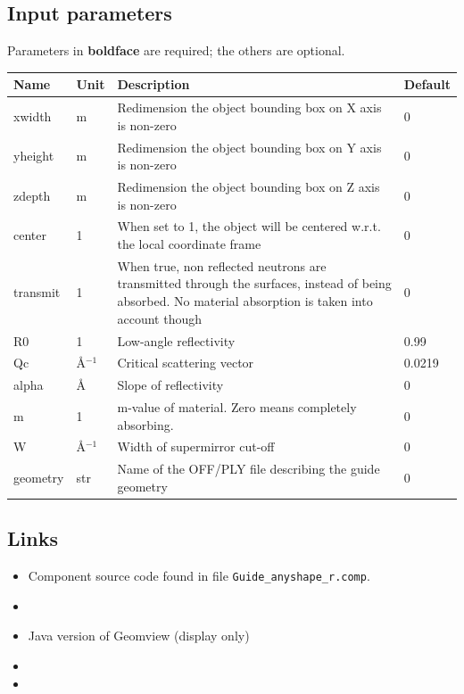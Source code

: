 \subsection*{Input parameters}
Parameters in \textbf{boldface} are required; the others are optional.

\begin{longtable}{p{}p{}p{}p{}}
\toprule
\textbf{Name} & \textbf{Unit} & \textbf{Description} & \textbf{Default} \\
\midrule
\endhead
xwidth & m & Redimension the object bounding box on X axis is non-zero & 0 \\
yheight & m & Redimension the object bounding box on Y axis is non-zero & 0 \\
zdepth & m & Redimension the object bounding box on Z axis is non-zero & 0 \\
center & 1 & When set to 1, the object will be centered w.r.t. the local coordinate frame & 0 \\
transmit & 1 & When true, non reflected neutrons are transmitted through the surfaces, instead of being absorbed. No material absorption is taken into account though & 0 \\
R0 & 1 & Low-angle reflectivity & 0.99 \\
Qc & \AA{}$^{-1}$ & Critical scattering vector & 0.0219 \\
alpha & \AA{} & Slope of reflectivity & 0 \\
m & 1 & m-value of material. Zero means completely absorbing. & 0 \\
W & \AA{}$^{-1}$ & Width of supermirror cut-off & 0 \\
geometry & str & Name of the OFF/PLY file describing the guide geometry & 0 \\
\bottomrule
\end{longtable}

\subsection*{Links}
\begin{itemize}
  \item Component source code found in file \texttt{Guide\_anyshape\_r.comp}.
  \item {}
  \item Java version of Geomview (display only) 
  \item {}
  \item {}
\end{itemize}
